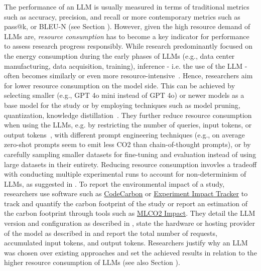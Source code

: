 
The performance of an LLM is usually measured in terms of traditional metrics such as accuracy, precision, and recall or more contemporary metrics such as pass@k, or BLEU-N (see Section \benchmarksmetrics).
However, given the high resource demand of LLMs are, \emph{resource consumption} has to become a key indicator for performance to assess research progress responsibly. 
While research predominantly focused on the energy consumption during the early phases of LLMs (e.g., data center manufacturing, data acquisition, training), inference - i.e. the use of the LLM - often becomes similarly or even more resource-intensive~\cite{de2023growing, DBLP:conf/mlsys/WuRGAAMCBHBGGOM22, DBLP:journals/corr/abs-2410-02950, JIANG2024202, mitu2024hidden}.
Hence, researchers  \should aim for lower resource consumption on the model side.
This can be achieved by selecting smaller (e.g., GPT 4o mini instead of GPT 4o) or newer models as a base model for the study or by employing techniques such as model pruning, quantization, knowledge distillation~\cite{mitu2024hidden}.
They \may further reduce resource consumption when using the LLMs, e.g. by restricting the number of queries, input tokens, or output tokens~\cite{mitu2024hidden}, with different prompt engineering techniques (e.g., on average zero-shot prompts seem to emit less CO2 than chain-of-thought prompts), or by carefully sampling smaller datasets for fine-tuning and evaluation instead of using large datasets in their entirety.
Reducing resource consumption invovles a tradeoff with conducting multiple experimental runs to account for non-determinism of LLMs, as suggested in \benchmarksmetrics.
To report the environmental impact of a study, researchers \should use software such as \href{https://github.com/mlco2/codecarbon}{CodeCarbon} or \href{experiment-impact-tracker}{Experiment Impact Tracker} to track and quantify the carbon footprint of the study or report an estimation of the carbon footprint through tools such as \href{https://mlco2.github.io/impact/#about}{MLCO2 Impact}.
They \should detail the LLM version and configuration as described in \modelversion, state the hardware or hosting provider of the model as described in \toolarchitecture and report the total number of requests, accumulated input tokens, and output tokens.
Researchers \must justify why an LLM was chosen over existing approaches and set the achieved results in relation to the higher resource consumption of LLMs (see also Section \benchmarksmetrics).


